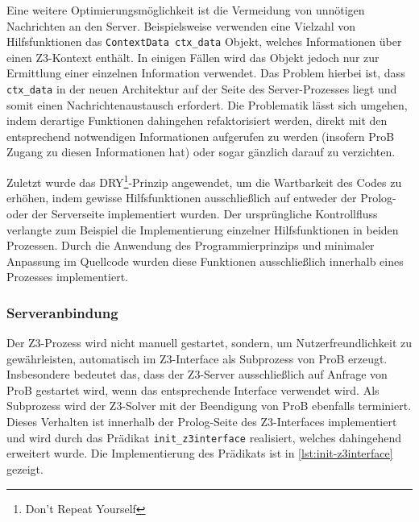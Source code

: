 Eine weitere Optimierungsmöglichkeit ist die Vermeidung von unnötigen Nachrichten an den Server.
Beispielsweise verwenden eine Vielzahl von Hilfsfunktionen das \texttt{ContextData ctx\_data} Objekt,
welches Informationen über einen Z3-Kontext enthält.
In einigen Fällen wird das Objekt jedoch nur zur Ermittlung einer einzelnen Information verwendet.
Das Problem hierbei ist,
dass \texttt{ctx\_data} in der neuen Architektur auf der Seite des Server-Prozesses liegt und somit einen Nachrichtenaustausch erfordert.
Die Problematik lässt sich umgehen, indem derartige Funktionen dahingehen refaktorisiert werden,
direkt mit den entsprechend notwendigen Informationen aufgerufen zu werden (insofern ProB Zugang zu diesen Informationen hat) oder sogar gänzlich darauf zu verzichten.



Zuletzt wurde das DRY\footnote{Don't Repeat Yourself}-Prinzip angewendet, um die Wartbarkeit des Codes zu erhöhen,
indem gewisse Hilfsfunktionen ausschließlich auf entweder der Prolog- oder der Serverseite implementiert wurden.
Der ursprüngliche Kontrollfluss verlangte zum Beispiel die Implementierung einzelner Hilfsfunktionen
in beiden Prozessen. Durch die Anwendung des Programmierprinzips und minimaler Anpassung im Quellcode wurden diese Funktionen ausschließlich innerhalb eines Prozesses implementiert.

\subsubsection{Serveranbindung}
\label{subsec:server-connection}

Der Z3-Prozess wird nicht manuell gestartet, sondern,
um Nutzerfreundlichkeit zu gewährleisten, automatisch im Z3-Interface als Subprozess von ProB erzeugt.
Insbesondere bedeutet das, dass der Z3-Server ausschließlich auf Anfrage von ProB gestartet wird, wenn das entsprechende Interface verwendet wird.
Als Subprozess wird der Z3-Solver mit der Beendigung von ProB ebenfalls terminiert.
Dieses Verhalten ist innerhalb der Prolog-Seite des Z3-Interfaces implementiert und wird durch das Prädikat \texttt{init\_z3interface} realisiert, welches dahingehend erweitert wurde.
Die Implementierung des Prädikats ist in \cref{lst:init-z3interface} gezeigt.

